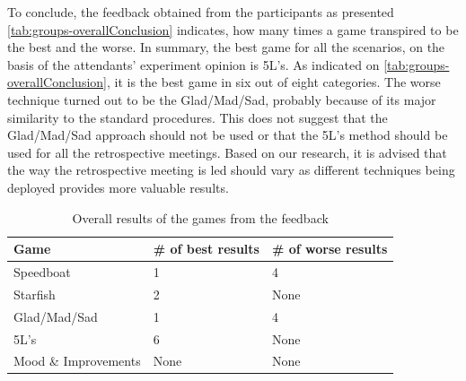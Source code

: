 To conclude, the feedback obtained from the participants as presented \autoref{tab:groups-overallConclusion} indicates, how many times a game transpired to be the best and the worse. In summary, the best game  for all the scenarios, on the basis of the attendants’ experiment opinion is 5L's. As indicated on \autoref{tab:groups-overallConclusion}, it is the best game in six out of eight categories. The worse technique turned out to be the Glad/Mad/Sad, probably because of its major similarity to the standard procedures. This does not suggest that the Glad/Mad/Sad approach should not be used or that the 5L’s method should be used for all the retrospective meetings. Based on our research, it is advised that the way the retrospective meeting is led should vary as different techniques being deployed provides more valuable results.

\begin{table}[!htbp]
	\caption{Overall results of the games from the feedback}
	\label{tab:groups-overallConclusion}
	\begin{tabularx}{\textwidth}{|X|X|X|}
	\hline
		Game & \# of best results & \# of worse results\\ \hline
		Speedboat & 1 & 4 \\ \hline
		Starfish & 2 & None \\ \hline
        Glad/Mad/Sad & 1 & 4 \\ \hline
        5L's & 6 & None \\ \hline
        Mood \& Improvements & None & None\\ \hline
	\end{tabularx}
\end{table}

